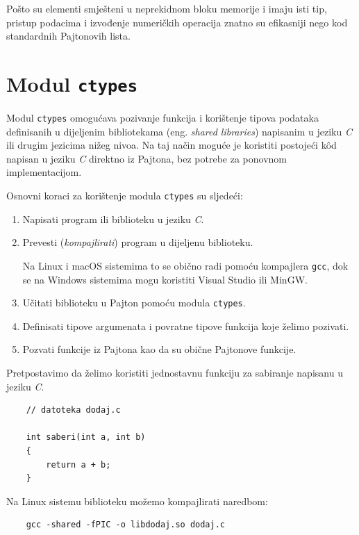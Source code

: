 Pošto su elementi smješteni u neprekidnom bloku memorije i imaju isti tip, pristup podacima i izvođenje numeričkih operacija znatno su efikasniji nego kod standardnih Pajtonovih lista.

\section{Modul \texttt{ctypes}}

Modul \texttt{ctypes} omogućava pozivanje funkcija i korištenje tipova podataka definisanih u dijeljenim bibliotekama (eng. \textit{shared libraries}) napisanim u jeziku \textit{C} ili drugim jezicima nižeg nivoa. Na taj način moguće je koristiti postojeći kôd napisan u jeziku \textit{C} direktno iz Pajtona, bez potrebe za ponovnom implementacijom.

Osnovni koraci za korištenje modula \texttt{ctypes} su sljedeći:

\begin{enumerate}
	\item Napisati program ili biblioteku u jeziku \textit{C}.

	\item Prevesti (\textit{kompajlirati}) program u dijeljenu biblioteku.
	
	Na Linux i macOS sistemima to se obično radi pomoću kompajlera \texttt{gcc}, dok se na Windows sistemima mogu koristiti Visual Studio ili MinGW.
	
	\item Učitati biblioteku u Pajton pomoću modula \texttt{ctypes}.
	
	\item Definisati tipove argumenata i povratne tipove funkcija koje želimo pozivati.
	
	\item Pozvati funkcije iz Pajtona kao da su obične Pajtonove funkcije.
\end{enumerate}

Pretpostavimo da želimo koristiti jednostavnu funkciju za sabiranje napisanu u jeziku \textit{C}.

\begin{verbatim}
	// datoteka dodaj.c
	
	int saberi(int a, int b)
	{
		return a + b;
	}
\end{verbatim}

Na Linux sistemu biblioteku možemo kompajlirati naredbom:

\begin{verbatim}
	gcc -shared -fPIC -o libdodaj.so dodaj.c
\end{verbatim}

